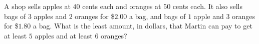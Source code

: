 A shop sells apples at $40$ cents each and oranges at $50$ cents each. It also sells bags of $3$ apples and $2$ oranges for \$$2.00$ a bag, and bags of $1$ apple and $3$ oranges for \$$1.80$ a bag. What is the least amount, in dollars, that Martin can pay to get at least $5$ apples and at least $6$ oranges?
